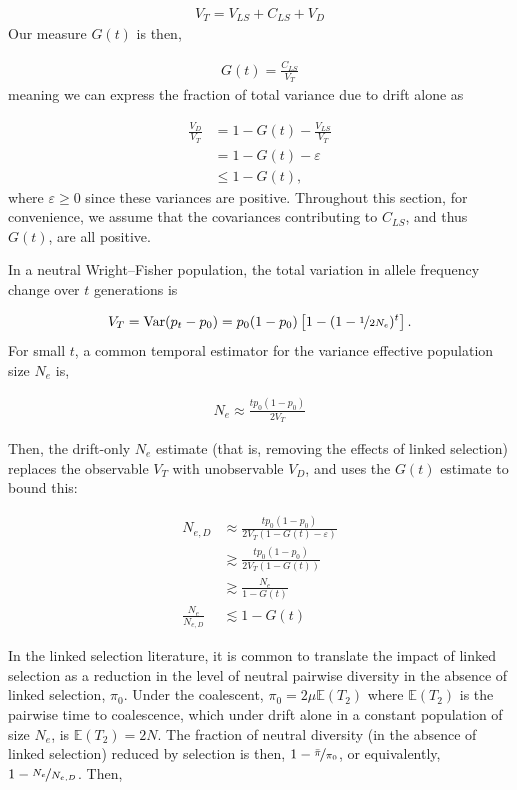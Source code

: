 \documentclass[11pt]{article}
\newcommand{\E}{\mathbb{E}}
\DeclareMathOperator{\var}{Var}
\begin{document}
{\begin{align}
  V_{T} = V_{LS} + C_{LS} + V_D
\end{align}
%
Our measure $G(t)$ is then,

\begin{align}
  G(t) = \frac{C_{LS}}{V_T}
\end{align}
%
meaning we can express the fraction of total variance due to drift alone as 

\begin{align}
  \frac{V_D}{V_T} &= 1 - G(t) - \frac{V_{LS}}{V_T} \\
                  &= 1 - G(t) - \varepsilon \\
                  & \le 1 - G(t),
\end{align}
%
where $\varepsilon \ge 0$ since these variances are positive. Throughout
this section, for convenience, we assume that the covariances contributing to
$C_{LS}$, and thus $G(t)$, are all positive.

In a neutral Wright--Fisher population, the total variation in allele
frequency change over $t$ generations is

\begin{align}
  V_T = \var(p_t - p_0) = p_0(1 - p_0) \left[ 1 - (1 - \nicefrac{1}{2N_e})^t \right].
\end{align}
%
For small $t$, a common temporal estimator for the variance effective
population size $N_e$ is,

\begin{align}
  N_e \approx \frac{t p_0(1-p_0)}{2 V_T}
\end{align}

Then, the drift-only $N_e$ estimate (that is, removing the effects of linked
selection) replaces the observable $V_T$ with unobservable $V_D$, and uses the
$G(t)$ estimate to bound this:

\begin{align}
  N_{e,D} &\approx \frac{t p_0(1-p_0)}{2 V_T(1 - G(t) - \varepsilon)} \\
          &\gtrsim  \frac{t p_0(1-p_0)}{2 V_T(1 - G(t))} \\
          &\gtrsim  \frac{N_e}{1 - G(t)} \\
  \frac{N_e}{N_{e,D}} &\lesssim  1 - G(t)
\end{align}

In the linked selection literature, it is common to translate the impact of
linked selection as a reduction in the level of neutral pairwise diversity in
the absence of linked selection, $\pi_0$. Under the coalescent, $\pi_0 = 2 \mu
\E(T_2)$ where $\E(T_2)$ is the pairwise time to coalescence, which under drift
alone in a constant population of size $N_e$, is $\E(T_2) = 2N$. The fraction of
neutral diversity (in the absence of linked selection) reduced by selection is
then, $1 - \nicefrac{\bar{\pi}}{\pi_0}$, or equivalently, $1 -
\nicefrac{N_e}{N_{e,D}}$. Then,

}
\end{document}
